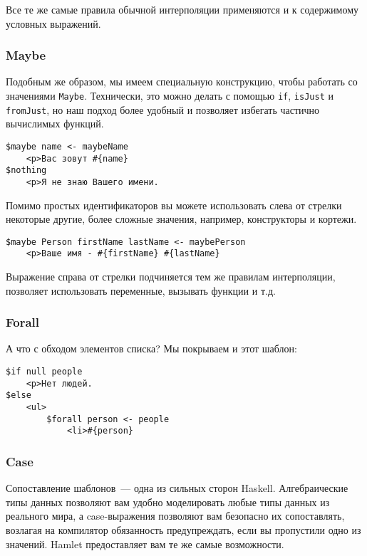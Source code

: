 Все те же самые правила обычной интерполяции применяются и к содержимому
условных выражений.

\subsubsection{Maybe}

Подобным же образом, мы имеем специальную конструкцию, чтобы работать со
значениями \lstinline'Maybe'. Технически, это можно делать с помощью
\lstinline'if', \lstinline'isJust' и \lstinline'fromJust', но наш подход более удобный и
позволяет избегать частично вычислимых функций.

\begin{lstlisting}
$maybe name <- maybeName
    <p>Ваc зовут #{name}
$nothing
    <p>Я не знаю Вашего имени.
\end{lstlisting}

Помимо простых идентификаторов вы можете использовать слева от стрелки
некоторые другие, более сложные значения, например, конструкторы и кортежи.

\begin{lstlisting}
$maybe Person firstName lastName <- maybePerson
    <p>Ваше имя - #{firstName} #{lastName}
\end{lstlisting}

Выражение справа от стрелки подчиняется тем же правилам интерполяции, позволяет
использовать переменные, вызывать функции и т.д.

\subsubsection{Forall}

А что с обходом элементов списка? Мы покрываем и этот шаблон:

\begin{lstlisting}
$if null people
    <p>Нет людей.
$else
    <ul>
        $forall person <- people
            <li>#{person}
\end{lstlisting}


\subsubsection{Case}

Сопоставление шаблонов~--- одна из сильных сторон Haskell. Алгебраические типы
данных позволяют вам удобно моделировать любые типы данных из реального мира, а
case-выражения позволяют вам безопасно их сопоставлять, возлагая на компилятор
обязанность предупреждать, если вы пропустили одно из значений.  Hamlet
предоставляет вам те же самые возможности.

